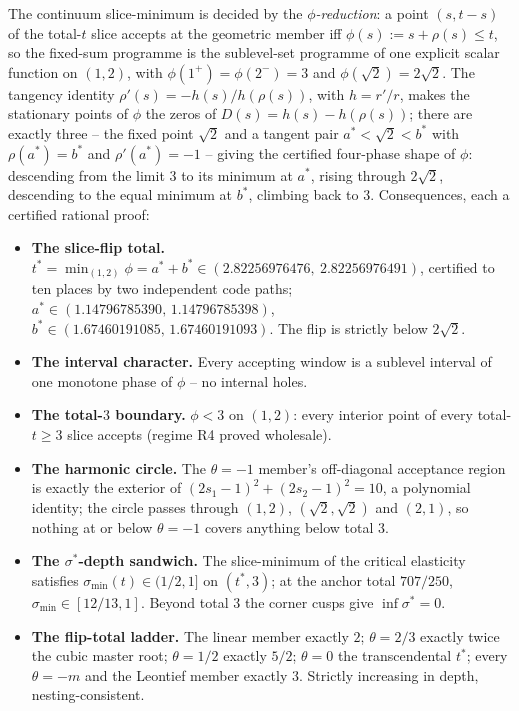 The continuum slice-minimum is decided by the \emph{$\phi$-reduction}: a point $(s,t-s)$ of the total-$t$ slice accepts at the geometric member iff $\phi(s):=s+\rho(s)\le t$, so the fixed-sum programme is the sublevel-set programme of one explicit scalar function on $(1,2)$, with $\phi(1^+)=\phi(2^-)=3$ and $\phi(\sqrt2)=2\sqrt2$. The tangency identity $\rho'(s)=-h(s)/h(\rho(s))$, with $h=r'/r$, makes the stationary points of $\phi$ the zeros of $D(s)=h(s)-h(\rho(s))$; there are exactly three -- the fixed point $\sqrt2$ and a tangent pair $a^*<\sqrt2<b^*$ with $\rho(a^*)=b^*$ and $\rho'(a^*)=-1$ -- giving the certified four-phase shape of $\phi$: descending from the limit $3$ to its minimum at $a^*$, rising through $2\sqrt2$, descending to the equal minimum at $b^*$, climbing back to $3$. Consequences, each a certified rational proof:
\begin{itemize}[leftmargin=2em]
\item \textbf{The slice-flip total.} $t^*=\min_{(1,2)}\phi=a^*+b^*\in(2.82256976476,\ 2.82256976491)$, certified to ten places by two independent code paths; $a^*\in(1.14796785390,\,1.14796785398)$, $b^*\in(1.67460191085,\,1.67460191093)$. The flip is strictly below $2\sqrt2$.
\item \textbf{The interval character.} Every accepting window is a sublevel interval of one monotone phase of $\phi$ -- no internal holes.
\item \textbf{The total-$3$ boundary.} $\phi<3$ on $(1,2)$: every interior point of every total-$t\ge3$ slice accepts (regime R4 proved wholesale).
\item \textbf{The harmonic circle.} The $\theta=-1$ member's off-diagonal acceptance region is exactly the exterior of $(2s_1-1)^2+(2s_2-1)^2=10$, a polynomial identity; the circle passes through $(1,2)$, $(\sqrt2,\sqrt2)$ and $(2,1)$, so nothing at or below $\theta=-1$ covers anything below total $3$.
\item \textbf{The $\sigma^*$-depth sandwich.} The slice-minimum of the critical elasticity satisfies $\sigma_{\min}(t)\in(1/2,1]$ on $(t^*,3)$; at the anchor total $707/250$, $\sigma_{\min}\in[12/13,1]$. Beyond total $3$ the corner cusps give $\inf\sigma^*=0$.
\item \textbf{The flip-total ladder.} The linear member exactly $2$; $\theta=2/3$ exactly twice the cubic master root; $\theta=1/2$ exactly $5/2$; $\theta=0$ the transcendental $t^*$; every $\theta=-m$ and the Leontief member exactly $3$. Strictly increasing in depth, nesting-consistent.
\end{itemize}

